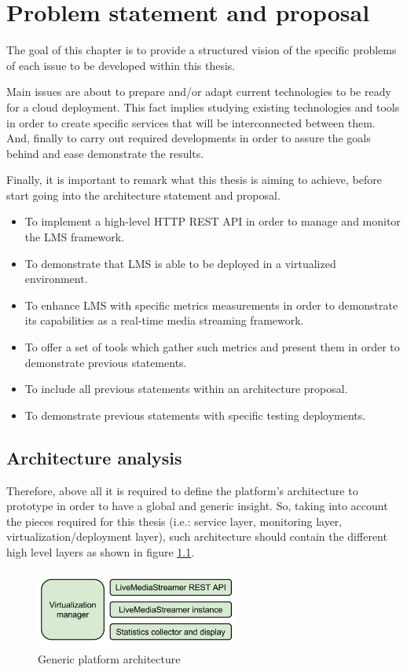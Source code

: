 \chapter{Problem statement and proposal}\label{B:problemStatementAndProposal}

The goal of this chapter is to provide a structured vision of the specific problems of each issue to be developed within this thesis.

Main issues are about to prepare and/or adapt current technologies to be ready for a cloud deployment. This fact implies studying existing technologies and tools in order to create specific services that will be interconnected between them. And, finally to carry out required developments in order to assure the goals behind and ease demonstrate the results.

Finally, it is important to remark what this thesis is aiming to achieve, before start going into the architecture statement and proposal.

\begin{itemize}
\item To implement a high-level HTTP REST API in order to manage and monitor the LMS framework.
\item To demonstrate that LMS is able to be deployed in a virtualized environment.
\item To enhance LMS with specific metrics measurements in order to demonstrate its capabilities as a real-time media streaming framework.
\item To offer a set of tools which gather such metrics and present them in order to demonstrate previous statements.
\item To include all previous statements within an architecture proposal.
\item To demonstrate previous statements with specific testing deployments.
\end{itemize}

\section{Architecture analysis}

Therefore, above all it is required to define the platform's architecture to prototype in order to have a global and generic insight. So, taking into account the pieces required for this thesis (i.e.: service layer, monitoring layer, virtualization/deployment layer), such architecture should contain the different high level layers as shown in figure \ref{F:genericPlatArch}.
\begin{figure}[htb]
\begin{center}
\includegraphics[width=0.6\textwidth]{./images/generalArch.png}
\caption{Generic platform architecture}
\label{F:genericPlatArch}
\end{center}
\end{figure}

